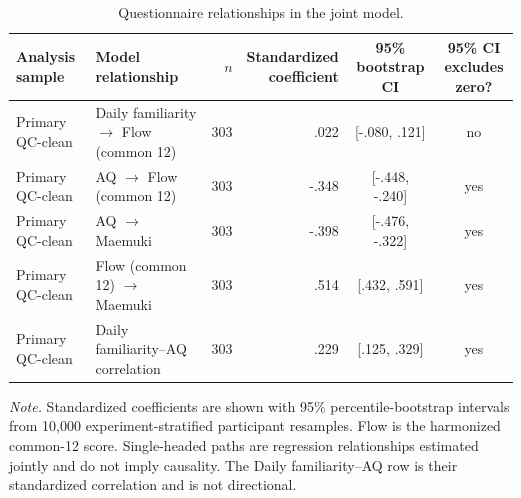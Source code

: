 \begin{table}[!htbp]
\centering
\caption{Questionnaire relationships in the joint model.}
\label{tab:sem-path-sensitivity}
\scriptsize
\setlength{\tabcolsep}{3pt}
\renewcommand{\arraystretch}{1.12}
\begin{tabularx}{\textwidth}{@{}>{\raggedright\arraybackslash}p{2.15cm}>{\raggedright\arraybackslash}X r r c c@{}}
\toprule
Analysis sample & Model relationship & $n$ & \shortstack{Standardized\\coefficient} & 95\% bootstrap CI & \shortstack{95\% CI\\excludes zero?} \\
\midrule
Primary QC-clean & Daily familiarity $\rightarrow$ Flow (common 12) & 303 & .022 & [-.080, .121] & no \\
Primary QC-clean & AQ $\rightarrow$ Flow (common 12) & 303 & -.348 & [-.448, -.240] & yes \\
Primary QC-clean & AQ $\rightarrow$ Maemuki & 303 & -.398 & [-.476, -.322] & yes \\
Primary QC-clean & Flow (common 12) $\rightarrow$ Maemuki & 303 & .514 & [.432, .591] & yes \\
Primary QC-clean & Daily familiarity--AQ correlation & 303 & .229 & [.125, .329] & yes \\
\bottomrule
\end{tabularx}
\vspace{0.5em}
\noindent\begin{minipage}{\textwidth}\footnotesize\textit{Note.} Standardized coefficients are shown with 95\% percentile-bootstrap intervals from 10,000 experiment-stratified participant resamples. Flow is the harmonized common-12 score. Single-headed paths are regression relationships estimated jointly and do not imply causality. The Daily familiarity--AQ row is their standardized correlation and is not directional.\end{minipage}
\end{table}
